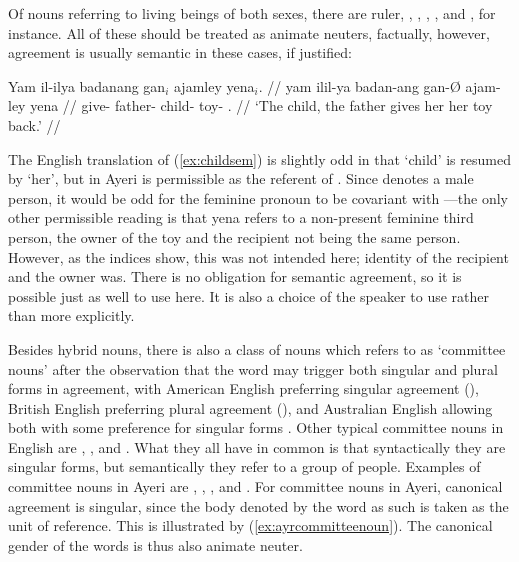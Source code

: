 Of nouns referring to living beings of both sexes, there are 
{ruler}, , ,
, , and
, for instance. All of these should be treated as
animate neuters, factually, however, agreement is usually semantic in these
cases, if justified:

\ex\label{ex:childsem}\begingl
	\gla Yam il-ilya badanang gan$_i$ ajamley yena$_i$. //
	\glb yam il\til{}il-ya badan-ang gan-Ø ajam-ley yena //
	\glc \DatT{} \Iter{}\til{}give-\TsgM{} father-\Aarg{} child-\Top{}
		toy-\PargI{} \TsgF{}.\Gen{} //
	\glft `The child, the father gives her her toy back.' //
\endgl\xe

The English translation of (\ref{ex:childsem}) is slightly odd in that `child'
is resumed by `her', but in Ayeri  is permissible as the
referent of . Since  denotes a
male person, it would be odd for the feminine pronoun to be covariant with
---the only other permissible reading is that 
{yena} refers to a non-present feminine third person, the owner of the toy and
the recipient not being the same person. However, as the indices show, this was
not intended here; identity of the recipient and the owner was. There is no
obligation for semantic agreement, so it is possible just as well to use
 here. It is also a choice of the speaker to use
 rather than  more explicitly.


Besides hybrid nouns, there is also a class of nouns which \citet{corbett2006}
refers to as `committee nouns' after the observation that the word 
 may trigger both singular and plural forms in agreement, with
American English preferring singular agreement (), British English preferring plural agreement (), and Australian English allowing both with some
preference for singular forms \citep[212--213]{corbett2006}. Other typical
committee nouns in English are , , and .
What they all have in common is that syntactically they are singular forms, but
semantically they refer to a group of people. Examples of committee nouns in
Ayeri are , ,
, and .
For committee nouns in Ayeri, canonical agreement is singular, since the body
denoted by the word as such is taken as the unit of reference. This is
illustrated by (\ref{ex:ayrcommitteenoun}). The canonical gender of the words
is thus also animate neuter.

